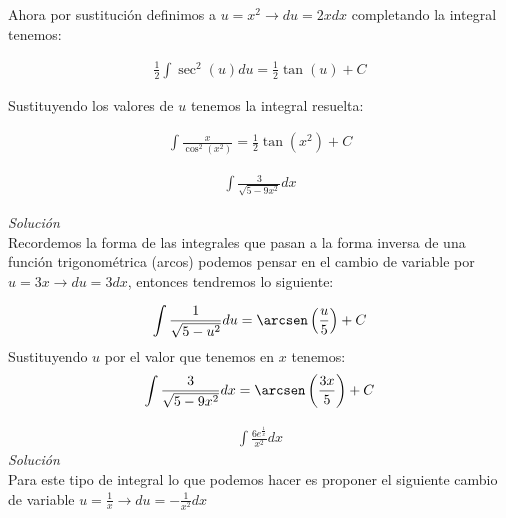 Ahora por sustitución definimos a \(\displaystyle u=x^{2} \rightarrow du=2x dx \) completando la integral tenemos:

\begin{equation*}
    \begin{gathered}
        \frac{1}{2}\int \sec^{2}(u)du = \frac{1}{2}\tan(u) + C
    \end{gathered}
\end{equation*}

Sustituyendo los valores de \(\displaystyle u\) tenemos la integral resuelta:

\begin{equation*}
    \begin{gathered}
        \int \frac{x}{\cos^{2}(x^{2})} = \frac{1}{2} \tan(x^{2}) + C 
    \end{gathered}
\end{equation*}

\vspace{1cm}
\begin{equation}
    \begin{gathered}
        \int \frac{3}{\sqrt{5-9x^{2}}}dx
    \end{gathered}
\end{equation}

\textit{Solución}\\
Recordemos la forma de las integrales que pasan a la forma inversa de una función trigonométrica (arcos) podemos pensar en el cambio de variable por \(\displaystyle u=3x \rightarrow du=3dx\), entonces tendremos lo siguiente:

\begin{equation*}
    \begin{gathered}
        \int \frac{1}{\sqrt{5-u^{2}}}du = \arcsen\left(\frac{u}{5}\right) + C
    \end{gathered}
\end{equation*}
Sustituyendo \(\displaystyle u\) por el valor que tenemos en \(\displaystyle x\) tenemos:\\
\begin{equation*}
    \begin{gathered}
        \int \frac{3}{\sqrt{5-9x^{2}}}dx = \arcsen\left(\frac{3x}{5}\right) + C
    \end{gathered}
\end{equation*}

\vspace{1cm}
\begin{equation}
    \begin{gathered}
        \int \frac{6 e^{\frac{1}{x}}}{x^{2}}dx
    \end{gathered}
\end{equation}
\textit{Solución}\\
Para este tipo de integral lo que podemos hacer es proponer el siguiente cambio de variable \(\displaystyle u = \frac{1}{x} \rightarrow du=-\frac{1}{x^{2}}dx\)

